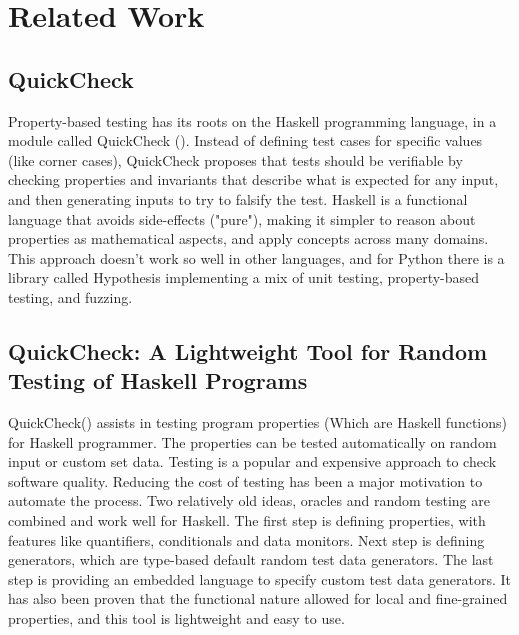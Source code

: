 \documentclass[preprint,nocopyrightspace]{sig-alternate}
\begin{document}
\section{Related Work}

\subsection{QuickCheck}
Property-based testing has its roots on the Haskell programming language,
in a module called QuickCheck (\citet{claessen_quickcheck:_2011}).
Instead of defining test cases for specific values (like corner cases),
QuickCheck proposes that tests should be verifiable by checking properties and invariants that describe what is expected for any input,
and then generating inputs to try to falsify the test.
Haskell is a functional language that avoids side-effects ("pure"),
making it simpler to reason about properties as mathematical aspects,
and apply concepts across many domains.
This approach doesn't work so well in other languages,
and for Python there is a library called Hypothesis implementing a mix of unit testing,
property-based testing,
and fuzzing.

\subsection{QuickCheck: A Lightweight Tool for Random Testing of Haskell Programs}
QuickCheck(\citet{claessen_quickcheck:_2011}) assists in testing program properties (Which are Haskell functions) for Haskell programmer.
The properties can be tested automatically on random input or custom set data.
Testing is a popular and expensive approach to check software quality.
Reducing the cost of testing has been a major motivation to automate the process.
Two relatively old ideas, oracles and random testing are combined and work well for Haskell.
The first step is defining properties, with features like quantifiers, conditionals and data monitors.
Next step is defining generators, which are type-based default random test data generators.
The last step is providing an embedded language to specify custom test data generators.
It has also been proven that the functional nature allowed for local and fine-grained properties,
and this tool is lightweight and easy to use.
\end{document}
